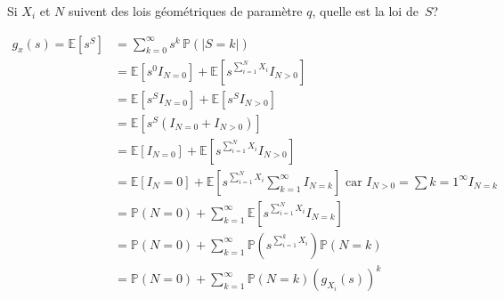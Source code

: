 \documentclass[a4paper,10pt,french,openany]{memoir}
\newcommand{\Proba}{\mathbb{P}}
\newcommand{\Esper}{\mathbb{E}}
\newcommand{\abs}[1]{\lvert #1 \rvert}
\begin{document}
Si $X_i$ et $N$ suivent des lois géométriques de paramètre $q$, quelle est la loi de~$S$?

\begin{align*}
 g_x(s) = \Esper\left[s^S\right] &= \sum_{k=0}^\infty s^k\,\Proba\left(\abs{S=k}\right) \\
 &= \Esper\left[s^0 I_{N=0}\right] + \Esper\left[s^{\sum_{i=1}^N X_i} I_{N>0}\right] \\
 &= \Esper\left[s^S I_{N=0}\right] + \Esper\left[s^S I_{N>0}\right] \\
 &= \Esper\left[s^S (I_{N=0} + I_{N>0})\right] \\
 &= \Esper[I_{N=0}] + \Esper\left[s^{\sum_{i=1}^N X_i} I_{N>0}\right] \\
 &= \Esper[I_N=0] + \Esper\left[s^{\sum_{i=1}^N X_i} \sum_{k=1}^\infty I_{N=k}\right] \text{ car } I_{N>0}=\sum{k=1}^\infty I_{N=k} \\
 &= \Proba(N=0) + \sum_{k=1}^\infty \Esper\left[s^{\sum_{i=1}^N X_i} I_{N=k}\right] \\
 &= \Proba(N=0) + \sum_{k=1}^\infty \Proba\left(s^{\sum_{i=1}^k X_i}\right) \Proba(N=k) \\
 &= \Proba(N=0) + \sum_{k=1}^\infty \Proba(N=k) (g_{X_i} (s))^k
\end{align*}
\end{document}
